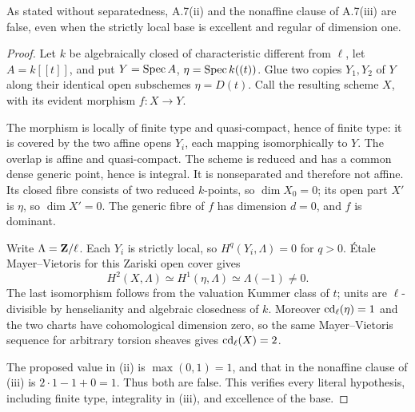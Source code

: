 \begin{theorem}
\label{A:double-trait}
As stated without separatedness, A.7(ii) and the nonaffine clause of A.7(iii) are false, even when the strictly local base is excellent and regular of dimension one.
\end{theorem}
\begin{proof}
Let $k$ be algebraically closed of characteristic different from $\ell$, let $A=k[[t]]$, and put $Y=\operatorname{Spec} A$, $\eta=\operatorname{Spec} k((t))$. Glue two copies $Y_1,Y_2$ of $Y$ along their identical open subschemes $\eta=D(t)$. Call the resulting scheme $X$, with its evident morphism $f:X\to Y$.

The morphism is locally of finite type and quasi-compact, hence of finite type: it is covered by the two affine opens $Y_i$, each mapping isomorphically to $Y$. The overlap is affine and quasi-compact. The scheme is reduced and has a common dense generic point, hence is integral. It is nonseparated and therefore not affine. Its closed fibre consists of two reduced $k$-points, so $\dim X_0=0$; its open part $X'$ is $\eta$, so $\dim X'=0$. The generic fibre of $f$ has dimension $d=0$, and $f$ is dominant.

Write $\Lambda=\mathbf Z/\ell$. Each $Y_i$ is strictly local, so $H^q(Y_i,\Lambda)=0$ for $q>0$. Étale Mayer--Vietoris for this Zariski open cover gives
\[
H^2(X,\Lambda)\simeq H^1(\eta,\Lambda)
\simeq\Lambda(-1)\neq0.
\]
The last isomorphism follows from the valuation Kummer class of $t$; units are $\ell$-divisible by henselianity and algebraic closedness of $k$. Moreover $\operatorname{cd}_\ell(\eta)=1$ and the two charts have cohomological dimension zero, so the same Mayer--Vietoris sequence for arbitrary torsion sheaves gives $\operatorname{cd}_\ell(X)=2$.

The proposed value in (ii) is $\max(0,1)=1$, and that in the nonaffine clause of (iii) is $2\cdot1-1+0=1$. Thus both are false. This verifies every literal hypothesis, including finite type, integrality in (iii), and excellence of the base.
\end{proof}

